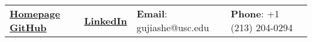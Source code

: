 \documentclass[letterpaper, 10pt]{article}
\begin{document}


\vspace{0.5cm} 
\begin{center}
\begin{tabular}{lllll}
 \href{https://jiashenggu.github.io/}{\textbf{Homepage}} 
 \href{https://github.com/jiashenggu}{\textbf{GitHub}}    &
 \href{https://www.linkedin.com/in/jiasheng-gu/}{\textbf{LinkedIn}} &
 \textbf{Email}: gujiashe@usc.edu      &
 \textbf{Phone}: +1 (213) 204-0294   & 

\end{tabular}
\end{center}


\setlength{\tabcolsep}{8pt}
\end{document}

